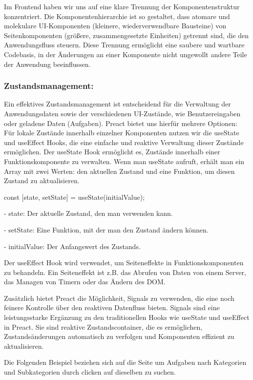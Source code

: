 \documentclass[12pt,a4paper]{article} %
\begin{document}
Im Frontend haben wir uns auf eine klare Trennung der Komponentenstruktur konzentriert. Die Komponentenhierarchie ist so gestaltet, dass atomare und molekulare UI-Komponenten (kleinere, wiederverwendbare Bausteine) von Seitenkomponenten (größere, zusammengesetzte Einheiten) getrennt sind, die den Anwendungsfluss steuern. Diese Trennung ermöglicht eine saubere und wartbare Codebasis, in der Änderungen an einer Komponente nicht ungewollt andere Teile der Anwendung beeinflussen.

\subsubsection{Zustandsmanagement:} 

Ein effektives Zustandsmanagement ist entscheidend für die Verwaltung der Anwendungsdaten sowie der verschiedenen UI-Zustände, wie Benutzereingaben oder geladene Daten (Aufgaben). Preact bietet uns hierfür mehrere Optionen: Für lokale Zustände innerhalb einzelner Komponenten nutzen wir die useState und useEffect Hooks, die eine einfache und reaktive Verwaltung dieser Zustände ermöglichen. 
Der useState Hook ermöglicht es, Zustände innerhalb einer Funktionskomponente zu verwalten. Wenn man useState aufruft, erhält man ein Array mit zwei Werten: den aktuellen Zustand und eine Funktion, um diesen Zustand zu aktualisieren.

const [state, setState] = useState(initialValue);

-	state: Der aktuelle Zustand, den man verwenden kann.

-	setState: Eine Funktion, mit der man den Zustand ändern können.

-	initialValue: Der Anfangswert des Zustands.

Der useEffect Hook wird verwendet, um Seiteneffekte in Funktionskomponenten zu behandeln. Ein Seiteneffekt ist z.B. das Abrufen von Daten von einem Server, das Managen von Timern oder das Ändern des DOM.

Zusätzlich bietet Preact die Möglichkeit, Signals zu verwenden, die eine noch feinere Kontrolle über den reaktiven Datenfluss bieten.
Signals sind eine leistungsstarke Ergänzung zu den traditionellen Hooks wie useState und useEffect in Preact. Sie sind reaktive Zustandscontainer, die es ermöglichen, Zustandsänderungen automatisch zu verfolgen und Komponenten effizient zu aktualisieren.

Die Folgenden Beispiel beziehen sich auf die Seite um Aufgaben nach Kategorien und Subkategorien durch clicken auf dieselben zu suchen.
\end{document}
